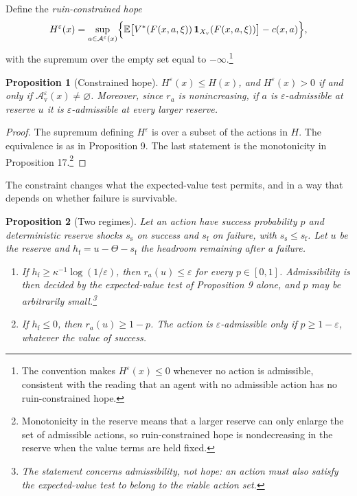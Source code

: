 \documentclass[11pt]{article}
\newtheorem{proposition}{Proposition}
\theoremstyle{remark}
\newcommand{\E}{\mathbb{E}}
\newcommand{\Xv}{X_{\mathrm{v}}}
\begin{document}
Define the \emph{ruin-constrained hope}
\[
H^\varepsilon(x)=\sup_{a\in\mathcal A^\varepsilon(x)}\Bigl\{\E\bigl[V^\ast(F(x,a,\xi))\,\mathbf 1_{\Xv}(F(x,a,\xi))\bigr]-c(x,a)\Bigr\},
\]
with the supremum over the empty set equal to $-\infty$.\footnote{The convention makes $H^\varepsilon(x)\le0$ whenever no action is admissible, consistent with the reading that an agent with no admissible action has no ruin-constrained hope.}

\begin{proposition}[Constrained hope]
$H^\varepsilon(x)\le H(x)$, and $H^\varepsilon(x)>0$ if and only if $\mathcal A^\varepsilon_{\mathrm v}(x)\neq\varnothing$. Moreover, since $r_a$ is nonincreasing, if $a$ is $\varepsilon$-admissible at reserve $u$ it is $\varepsilon$-admissible at every larger reserve.
\end{proposition}

\begin{proof}
The supremum defining $H^\varepsilon$ is over a subset of the actions in $H$. The equivalence is as in Proposition 9. The last statement is the monotonicity in Proposition 17.\footnote{Monotonicity in the reserve means that a larger reserve can only enlarge the set of admissible actions, so ruin-constrained hope is nondecreasing in the reserve when the value terms are held fixed.}
\end{proof}

The constraint changes what the expected-value test permits, and in a way that depends on whether failure is survivable.

\begin{proposition}[Two regimes]
Let an action have success probability $p$ and deterministic reserve shocks $s_{\mathrm s}$ on success and $s_{\mathrm f}$ on failure, with $s_{\mathrm s}\le s_{\mathrm f}$. Let $u$ be the reserve and $h_{\mathrm f}=u-\Theta-s_{\mathrm f}$ the headroom remaining after a failure.
\begin{enumerate}[label=(\roman*),nosep]
\item If $h_{\mathrm f}\ge\kappa^{-1}\log(1/\varepsilon)$, then $r_a(u)\le\varepsilon$ for every $p\in[0,1]$. Admissibility is then decided by the expected-value test of Proposition 9 alone, and $p$ may be arbitrarily small.\footnote{The statement concerns admissibility, not hope: an action must also satisfy the expected-value test to belong to the viable action set.}
\item If $h_{\mathrm f}\le0$, then $r_a(u)\ge1-p$. The action is $\varepsilon$-admissible only if $p\ge1-\varepsilon$, whatever the value of success.
\end{enumerate}
\end{proposition}
\end{document}
